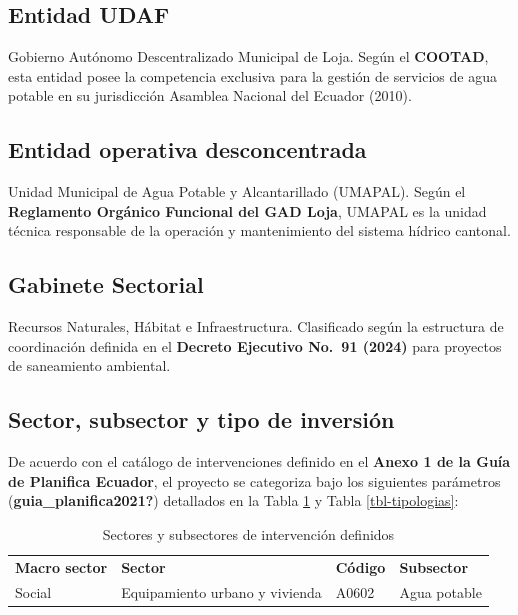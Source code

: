 \documentclass[12pt,spanish]{article}
\begin{document}
\subsection{Entidad UDAF}\label{entidad-udaf}

Gobierno Autónomo Descentralizado Municipal de Loja. Según el
\textbf{COOTAD}, esta entidad posee la competencia exclusiva para la
gestión de servicios de agua potable en su jurisdicción Asamblea
Nacional del Ecuador (2010).

\subsection{Entidad operativa
desconcentrada}\label{entidad-operativa-desconcentrada}

Unidad Municipal de Agua Potable y Alcantarillado (UMAPAL). Según el
\textbf{Reglamento Orgánico Funcional del GAD Loja}, UMAPAL es la unidad
técnica responsable de la operación y mantenimiento del sistema hídrico
cantonal.

\subsection{Gabinete Sectorial}\label{gabinete-sectorial}

Recursos Naturales, Hábitat e Infraestructura. Clasificado según la
estructura de coordinación definida en el \textbf{Decreto Ejecutivo
No.~91 (2024)} para proyectos de saneamiento ambiental.

\subsection{Sector, subsector y tipo de
inversión}\label{sector-subsector-y-tipo-de-inversiuxf3n}

De acuerdo con el catálogo de intervenciones definido en el
\textbf{Anexo 1 de la Guía de Planifica Ecuador}, el proyecto se
categoriza bajo los siguientes parámetros
(\textbf{guia\_planifica2021?}) detallados en la Tabla
\ref{tbl-sectores} y Tabla \ref{tbl-tipologias}:

\begin{longtable}{llll}

\caption{\label{tbl-sectores}Sectores y subsectores de intervención
definidos}

\tabularnewline

  \\
\toprule
\textbf{Macro sector} & \textbf{Sector} & \textbf{Código} & \textbf{Subsector} \\
\midrule
Social & Equipamiento urbano y vivienda & A0602 & Agua potable \\
\bottomrule

\end{longtable}
\end{document}
